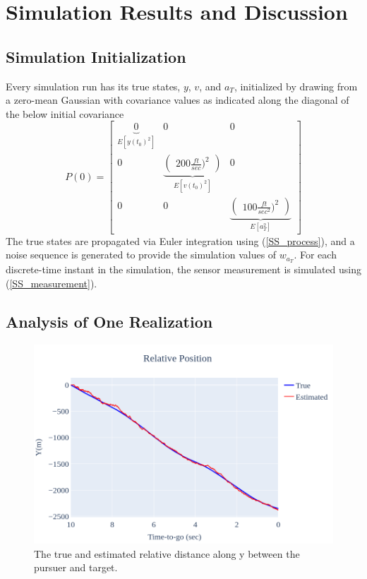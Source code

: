 \documentclass{article}
\begin{document}
\section{Simulation Results and Discussion}
\subsection{Simulation Initialization}
Every simulation run has its true states, $y$, $v$, and $a_T$, initialized by drawing from a zero-mean Gaussian
with covariance values as indicated along the diagonal of the below initial covariance
\begin{equation}
    P(0) = 
    \begin{bmatrix}
        \underbrace{0}_{E[y(t_0)^2]} & 0 & 0 \\
        0 & \underbrace{\begin{pmatrix}200 \frac{ft}{sec})^2 \end{pmatrix}}_{E[v(t_0)^2]} & 0 \\
        0 & 0 & \underbrace{\begin{pmatrix}100 \frac{ft}{sec^2})^2 \end{pmatrix}}_{E[a_T^2]}
    \end{bmatrix}
\end{equation}
The true states are propagated via Euler integration using (\ref{SS_process}), and a noise sequence is generated to provide the simulation values of $w_{a_T}$. 
For each discrete-time instant in the simulation, the sensor measurement is simulated using (\ref{SS_measurement}).
\subsection{Analysis of One Realization}
\begin{figure}
    \centering
    \includegraphics[width=1\textwidth]{figy.png}
    \caption{The true and estimated relative distance along y between the pursuer and target.}
    \label{Relative_Position}
\end{figure}
\end{document}
